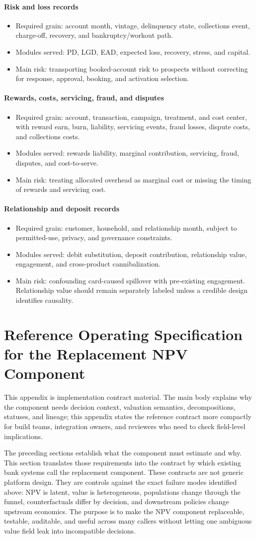\documentclass[11pt]{article}
\newcommand{\1}{\mathbf{1}}
\newcommand{\contractitem}[2]{\paragraph{#1}\begin{itemize}[leftmargin=1.5em,itemsep=0.12em,topsep=0.18em]#2\end{itemize}}
\begin{document}
\contractitem{Risk and loss records}{
  \item Required grain: account month, vintage, delinquency state, collections
        event, charge-off, recovery, and bankruptcy/workout path.
  \item Modules served: PD, LGD, EAD, expected loss, recovery, stress, and
        capital.
  \item Main risk: transporting booked-account risk to prospects without
        correcting for response, approval, booking, and activation selection.
}
\contractitem{Rewards, costs, servicing, fraud, and disputes}{
  \item Required grain: account, transaction, campaign, treatment, and cost
        center, with reward earn, burn, liability, servicing events, fraud
        losses, dispute costs, and collections costs.
  \item Modules served: rewards liability, marginal contribution, servicing,
        fraud, disputes, and cost-to-serve.
  \item Main risk: treating allocated overhead as marginal cost or missing the
        timing of rewards and servicing cost.
}
\contractitem{Relationship and deposit records}{
  \item Required grain: customer, household, and relationship month, subject to
        permitted-use, privacy, and governance constraints.
  \item Modules served: debit substitution, deposit contribution, relationship
        value, engagement, and cross-product cannibalization.
  \item Main risk: confounding card-caused spillover with pre-existing
        engagement. Relationship value should remain separately labeled unless
        a credible design identifies causality.
}

\section{Reference Operating Specification for the Replacement NPV Component}
\label{sec:operating-spec}

This appendix is implementation contract material. The main body explains why
the component needs decision context, valuation semantics, decompositions,
statuses, and lineage; this appendix states the reference contract more
compactly for build teams, integration owners, and reviewers who need to check
field-level implications.

The preceding sections establish what the component must estimate and why.
This section translates those requirements into the contract by which existing
bank systems call the replacement component. These contracts are not generic
platform design. They are controls against the exact failure modes identified
above: NPV is latent, value is heterogeneous, populations change through the
funnel, counterfactuals differ by decision, and downstream policies change
upstream economics. The purpose is to make the NPV component replaceable,
testable, auditable, and useful across many callers without letting one
ambiguous value field leak into incompatible decisions.
\end{document}
